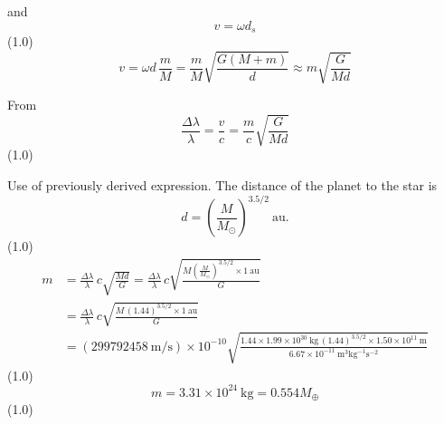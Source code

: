 \begin{description}
and
\[ v = \omega d_s \]
\hfill(1.0)
\[ v = \omega d\,\frac{m}{M} = \frac{m}{M}\sqrt{\frac{G(M+m)}{d}}
     \approx m\sqrt{\frac{G}{Md}} \]

From
\[ \frac{\Delta\lambda}{\lambda} = \frac{v}{c} = \frac{m}{c}\sqrt{\frac{G}{Md}} \]
\hfill(1.0)

Use of previously derived expression. The distance of the planet to the star
is
\[ d = \left(\frac{M}{M_\odot}\right)^{3.5/2}\ \mathrm{au}. \]
\hfill(1.0)
\begin{align*}
m &= \frac{\Delta\lambda}{\lambda}\,c\sqrt{\frac{Md}{G}}
   = \frac{\Delta\lambda}{\lambda}\,c
     \sqrt{\frac{M\left(\frac{M}{M_\odot}\right)^{3.5/2}\times 1\ \mathrm{au}}{G}}\\
  &= \frac{\Delta\lambda}{\lambda}\,c
     \sqrt{\frac{M\,(1.44)^{3.5/2}\times 1\ \mathrm{au}}{G}}\\
  &= (299792458\ \mathrm{m/s})\times10^{-10}
     \sqrt{\frac{1.44\times1.99\times10^{30}\ \mathrm{kg}\,
       (1.44)^{3.5/2}\times1.50\times10^{11}\ \mathrm{m}}
       {6.67\times10^{-11}\ \mathrm{m^3kg^{-1}s^{-2}}}}
\end{align*}
\hfill(1.0)
\[ m = 3.31\times10^{24}\ \mathrm{kg} = 0.554 M_\oplus \]
\hfill(1.0)
\end{description}

